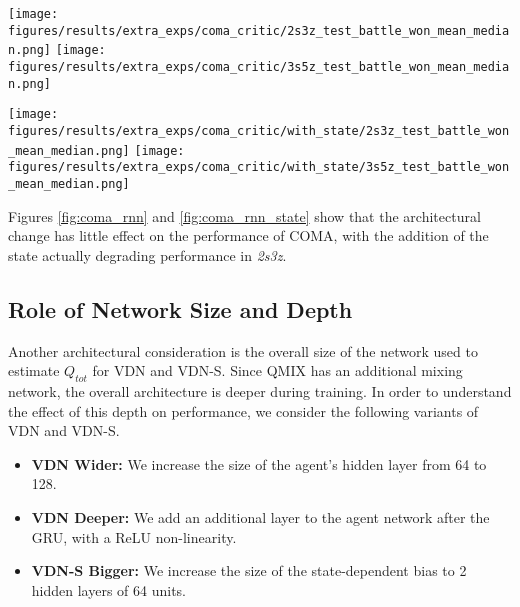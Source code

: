 \documentclass[twoside,11pt]{article}
\begin{document}
\begin{figure*}[h!]
    \centering
    \texttt{[image: figures/results/extra\_exps/coma\_critic/2s3z\_test\_battle\_won\_mean\_median.png]}
    \texttt{[image: figures/results/extra\_exps/coma\_critic/3s5z\_test\_battle\_won\_mean\_median.png]}
    \caption{Comparing the different architectures for the COMA critic without the state, on two scenarios.}
    \label{fig:coma_rnn}
\end{figure*}

\begin{figure*}[h!]
    \centering
    \texttt{[image: figures/results/extra\_exps/coma\_critic/with\_state/2s3z\_test\_battle\_won\_mean\_median.png]}
    \texttt{[image: figures/results/extra\_exps/coma\_critic/with\_state/3s5z\_test\_battle\_won\_mean\_median.png]}
    \caption{Comparing the different architectures for the COMA critic with the state on two scenarios.}
    \label{fig:coma_rnn_state}
\end{figure*}

Figures \ref{fig:coma_rnn} and \ref{fig:coma_rnn_state} show that the architectural change has little effect on the performance of COMA, with the addition of the state actually degrading performance in \textit{2s3z}. 

\subsection{Role of Network Size and Depth}

Another architectural consideration is the overall size of the network used to estimate $Q_{tot}$ for VDN and VDN-S.
Since QMIX has an additional mixing network, the overall architecture is deeper 
during training.
In order to understand the effect of this depth on performance, we consider the following variants of VDN and VDN-S.
\begin{itemize}
    \item \textbf{VDN Wider:} We increase the size of the agent's hidden layer from 64 to 128. 
    \item \textbf{VDN Deeper:} We add an additional layer to the agent network after the GRU, with a ReLU non-linearity. 
    \item \textbf{VDN-S Bigger:} We increase the size of the state-dependent bias to 2 hidden layers of 64 units.
\end{itemize}
\end{document}
